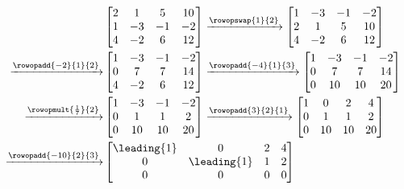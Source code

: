 \begin{align*}
&
\begin{bmatrix}
2 & 1 & 5 & 10\\ 
1 & -3 & -1 & -2\\ 
4 & -2 & 6 & 12
\end{bmatrix}
%
\xrightarrow{\rowopswap{1}{2}}
\begin{bmatrix}
1 & -3 & -1 & -2\\ 
2 & 1 & 5 & 10\\ 
4 & -2 & 6 & 12
\end{bmatrix}\\
%
\xrightarrow{\rowopadd{-2}{1}{2}}
&
\begin{bmatrix}
1 & -3 & -1 & -2\\ 
0 & 7 & 7 & 14\\ 
4 & -2 & 6 & 12
\end{bmatrix}
%
\xrightarrow{\rowopadd{-4}{1}{3}}
\begin{bmatrix}
1 & -3 & -1 & -2\\ 
0 & 7 & 7 & 14\\ 
0 & 10 & 10 & 20
\end{bmatrix}\\
%
\xrightarrow{\rowopmult{\frac{1}{7}}{2}}
&
\begin{bmatrix}
1 & -3 & -1 & -2\\ 
0 & 1 & 1 & 2\\ 
0 & 10 & 10 & 20
\end{bmatrix}
%
\xrightarrow{\rowopadd{3}{2}{1}}
\begin{bmatrix}
1 & 0 & 2 & 4\\
0 & 1 & 1 & 2\\
0 & 10 & 10 & 20
\end{bmatrix}\\
%
\xrightarrow{\rowopadd{-10}{2}{3}}
&
\begin{bmatrix}
\leading{1} & 0 & 2 & 4\\
0 & \leading{1} & 1 & 2\\
0 & 0 & 0 & 0
\end{bmatrix}
%
\end{align*}
%
